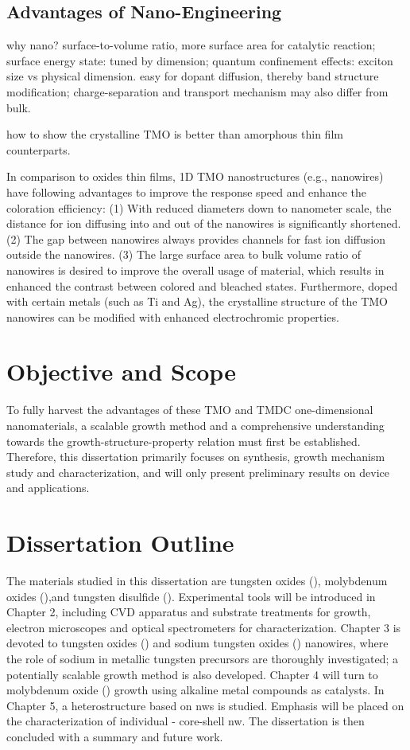 \subsection{Advantages of Nano-Engineering}

why nano? surface-to-volume ratio, more surface area for catalytic reaction; surface energy state: tuned by dimension; quantum confinement effects: exciton size vs physical dimension. easy for dopant diffusion, thereby band structure modification; charge-separation and transport mechanism may also differ from bulk.

how to show the crystalline TMO is better than amorphous thin film counterparts.

In comparison to oxides thin films, 1D TMO nanostructures (e.g., nanowires) have following advantages to improve the response speed and enhance the coloration efficiency: (1) With reduced diameters down to nanometer scale, the distance for ion diffusing into and out of the nanowires is significantly shortened. (2) The gap between nanowires always provides channels for fast ion diffusion outside the nanowires. (3) The large surface area to bulk volume ratio of nanowires is desired to improve the overall usage of material, which results in enhanced the contrast between colored and bleached states. Furthermore, doped with certain metals (such as Ti and Ag), the crystalline structure of the TMO nanowires can be modified with enhanced electrochromic properties.\cite{Xiong2008} 

\section{Objective and Scope}
To fully harvest the advantages of these TMO and TMDC one-dimensional nanomaterials, a scalable growth method and a comprehensive understanding towards the growth-structure-property relation must first be established. Therefore, this dissertation primarily focuses on synthesis, growth mechanism study and characterization, and will only present preliminary results on device and applications.

\section{Dissertation Outline}
The materials studied in this dissertation are tungsten oxides (), molybdenum oxides (),and tungsten disulfide (). Experimental tools will be introduced in Chapter 2, including CVD apparatus and substrate treatments for growth, electron microscopes and optical spectrometers for characterization. Chapter 3 is devoted to tungsten oxides () and sodium tungsten oxides () nanowires, where the role of sodium in metallic tungsten precursors are thoroughly investigated; a potentially scalable growth method is also developed. Chapter 4 will turn to molybdenum oxide () growth using alkaline metal compounds as catalysts. In Chapter 5, a heterostructure based on  \glspl{nw} is studied. Emphasis will be placed on the characterization of individual - core-shell \gls{nw}. The dissertation is then concluded with a summary and future work. 
